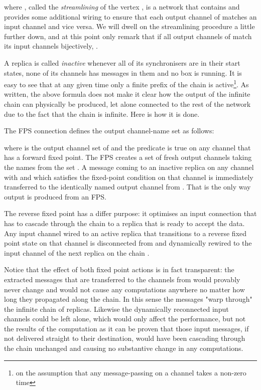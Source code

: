 \documentclass[11pt]{report}
\begin{document}
where , called the {\em streamlining} of the vertex , is a network that contains  and provides some additional wiring to ensure that each output channel of  matches an input channel
and vice versa. We will dwell on the streamlining procedure a little further down, and at this point only remark that if all output channels of  match its input channels bijectively, .

A replica  is called {\em inactive} whenever all of its synchronisers are in their start states, none of its channels has messages in them and no box is running. It is easy to see that at any given time only a finite prefix of the chain is active\footnote{on the assumption that any message-passing on a channel takes a non-zero time}. As written, the above formula does not make it clear how the output of the infinite chain can physically be produced, let alone connected to the rest of the network due to the fact that the chain is infinite. Here is how it is done.

The FPS connection  defines the output channel-name set  as follows:

where  is the output channel set of  and the predicate  is true on any channel  that has a forward fixed point. The FPS creates a set of fresh output channels  taking the names from the set .   A message coming to an inactive replica on any channel  with  and which satisfies the fixed-point condition on that channel is  immediately transferred to the identically named output channel from . That is the only way output is produced from an FPS.

The reverse fixed point has a differ purpose: it optimises an input connection that has to cascade through the chain to a replica that is ready to accept the data. Any input channel  wired to an active replica  that transitions to a reverse fixed point state on that channel is disconnected from   and dynamically rewired to the input channel  of the next replica on the chain .

Notice that the effect of both fixed point actions is in fact transparent: the extracted messages that are transferred to the channels from  would provably never change and would not cause any computations anywhere no matter how long they propagated along the chain. In this sense the messages "warp through" the infinite chain of replicas. Likewise the dynamically reconnected input channels could be left alone, which would only affect the performance, but not the results of the computation as it can be proven that those input messages, if not delivered straight to their destination,  would have been cascading through the chain unchanged and causing no substantive change in any computations.
\end{document}
